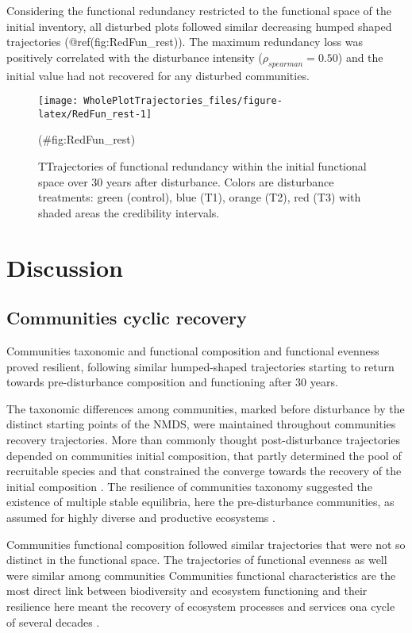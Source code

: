 \documentclass[fleqn,10pt]{ArtEcoFoG} %
\theoremstyle{definition}
\theoremstyle{definition}
\theoremstyle{definition}
\theoremstyle{remark}
\begin{document}
Considering the functional redundancy restricted to the functional space
of the initial inventory, all disturbed plots followed similar
decreasing humped shaped trajectories (@ref(fig:RedFun\_rest)). The
maximum redundancy loss was positively correlated with the disturbance
intensity (\(\rho_{spearman}=0.50\)) and the initial value had not
recovered for any disturbed communities.

\begin{figure}

{\centering \texttt{[image: WholePlotTrajectories\_files/figure-latex/RedFun\_rest-1]} 

}

\caption{TTrajectories of functional redundancy within the initial functional space over 30 years after disturbance. Colors are disturbance treatments: green (control), blue (T1), orange (T2), red (T3) with shaded areas the credibility intervals.}(\#fig:RedFun_rest)
\end{figure}

\section{Discussion}\label{discussion}

\subsection{Communities cyclic
recovery}\label{communities-cyclic-recovery}

Communities taxonomic and functional composition and functional evenness
proved resilient, following similar humped-shaped trajectories starting
to return towards pre-disturbance composition and functioning after 30
years.

The taxonomic differences among communities, marked before disturbance
by the distinct starting points of the NMDS, were maintained throughout
communities recovery trajectories. More than commonly thought
post-disturbance trajectories depended on communities initial
composition, that partly determined the pool of recruitable species and
that constrained the converge towards the recovery of the initial
composition
\citep{Hubbell1999, Molino2001, Anderson2007, Baraloto2012a}. The
resilience of communities taxonomy suggested the existence of multiple
stable equilibria, here the pre-disturbance communities, as assumed for
highly diverse and productive ecosystems \citep{Chase2003}.

Communities functional composition followed similar trajectories that
were not so distinct in the functional space. The trajectories of
functional evenness as well were similar among communities Communities
functional characteristics are the most direct link between biodiversity
and ecosystem functioning and their resilience here meant the recovery
of ecosystem processes and services ona cycle of several decades
\citep{Diaz2005, Guariguata2001}.
\end{document}
